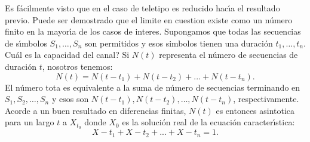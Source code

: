 Es f\'{a}cilmente visto que en el caso de teletipo es reducido
hac\'{\i}a el resultado previo. Puede ser demostrado que el limite en
cuestion existe como un n\'{u}mero finito en la mayor\'{\i}a de los
casos de interes.  Supongamos que todas las secuencias de
s\'{\i}mbolos $S_1, \ldots, S_n$ son permitidos y esos simbolos tienen
una duraci\'{o}n $t_1, \ldots,t_n$. {\textquestiondown}Cu\'{a}l es la
capacidad del canal? Si $N(t)$ representa el n\'{u}mero de secuencias de
duraci\'{o}n $t$, nosotros tenemos:
\begin{equation}
N(t) = N(t-t_1) + N(t-t_2) + ... +N(t-t_n).
\end{equation}
El n\'{u}mero tota es equivalente a la suma de n\'{u}mero de
secuencias terminando en $S_1, S_2, \ldots, S_n$ y esos son $N(t-t_1),
N(t-t_2), \ldots, N(t-t_n)$, respectivamente. Acorde a un buen
resultado en diferencias finitas, $N(t)$ es entonces asintotica para
un largo $t$ a $X_{t_0}$ donde $X_0$ es la soluci\'{o}n real de la
ecuaci\'{o}n caracter\'{\i}stica:
\begin{equation}
X-t_1 + X-t_2 + ... + X-t_n = 1.
\end{equation}

